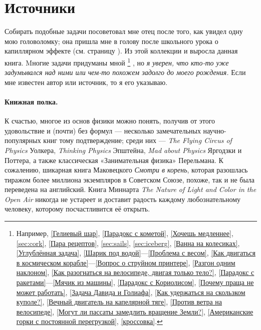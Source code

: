\section{Источники}

Собирать подобные задачи посоветовал мне отец после того, как увидел одну мою головоломку;
она пришла мне в голову после школьного урока о капиллярном эффекте (см. страницу \pageref{Вечный двигатель на капелярной тяге}).
Из этой коллекции и выросла данная книга.
Mногие задачи придуманы мной%
\footnote{Например,
\ref{Гелиевый шар}, \ref{Парадокс с кометой}, \ref{Хочешь медленнее},
\ref{sec:cork}, \ref{Пара рецептов}, \ref{sec:sails}, \ref{sec:iceberg},
\ref{Ванна на колесиках}, \ref{Углублённая задача}, \ref{Шарик под водой}---\ref{Проблема с весом},
\ref{Как двигаться в космическом корабле}---\ref{Вопрос о струйном принтере},
\ref{Разгон одним наклоном}, \ref{Как разогнаться на велосипеде, двигая только тело?}, \ref{Парадокс с ракетами}---\ref{Мячик из машины},
\ref{Парадокс с Кориолисом}, \ref{Почему праща не может работать}, \ref{Задача Давида и Голиафа},
\ref{Как удержаться на скользком куполе?},
\ref{Вечный двигатель на капелярной тяге},
\ref{Против ветра на велосипеде},
\ref{Могут ли пассаты замедлить вращение Земли?},
\ref{Американские горки с постоянной перегрузкой}, \ref{кроссовка}.}%
, но \emph{я уверен, что кто-то уже задумывался над ними или чем-то похожем задолго до моего рождения.}
Если мне известен автор или источник, то я его указываю.

\paragraph{Книжная полка.}
К счастью, %
многое из основ физики можно понять, получив от этого удовольствие и (почти) без формул ---
несколько замечательных научно-популярных книг тому подтверждение;
среди них --- \emph{The Flying Circus of Physics} Уолкера,
\emph{Thinking Physics} Эпштейна,
\emph{Mad about Physics} Яргодзки и Поттера,
а также классическая «Занимательная физика» Перельмана.
К сожалению, шикарная книга Маковецкого \emph{Смотри в корень}, которая разошлась тиражом более миллиона экземпляров в Советском Союзе, похоже, так и не была переведена на английский.
Книга Миннарта \emph{The Nature of Light and Color in the Open Air} никогда не устареет и доставит радость каждому любознательному человеку, которому посчастливится её открыть.
